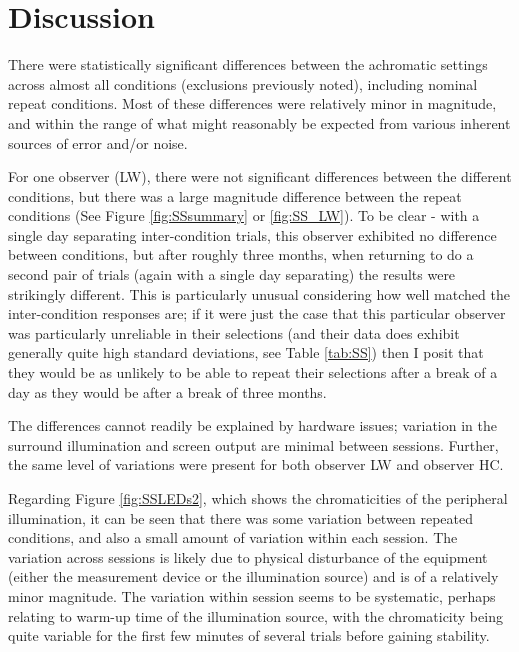 
\section{Discussion}

There were statistically significant differences between the achromatic settings across almost all conditions (exclusions previously noted), including nominal repeat conditions. Most of these differences were relatively minor in magnitude, and within the range of what might reasonably be expected from various inherent sources of error and/or noise.

For one observer (LW), there were not significant differences between the different conditions, but there was a large magnitude difference between the repeat conditions (See Figure \ref{fig:SSsummary} or \ref{fig:SS_LW}). To be clear - with a single day separating inter-condition trials, this observer exhibited no difference between conditions, but after roughly three months, when returning to do a second pair of trials (again with a single day separating) the results were strikingly different. This is particularly unusual considering how well matched the inter-condition responses are; if it were just the case that this particular observer was particularly unreliable in their selections (and their data does exhibit generally quite high standard deviations, see Table \ref{tab:SS}) then I posit that they would be as unlikely to be able to repeat their selections after a break of a day as they would be after a break of three months.

The differences cannot readily be explained by hardware issues; variation in the surround illumination and screen output are minimal between sessions. Further, the same level of variations were present for both observer LW and observer HC.

Regarding Figure \ref{fig:SSLEDs2}, which shows the chromaticities of the peripheral illumination, it can be seen that there was some variation between repeated conditions, and also a small amount of variation within each session. The variation across sessions is likely due to physical disturbance of the equipment (either the measurement device or the illumination source) and is of a relatively minor magnitude. The variation within session seems to be systematic, perhaps relating to warm-up time of the illumination source, with the chromaticity being quite variable for the first few minutes of several trials before gaining stability.

